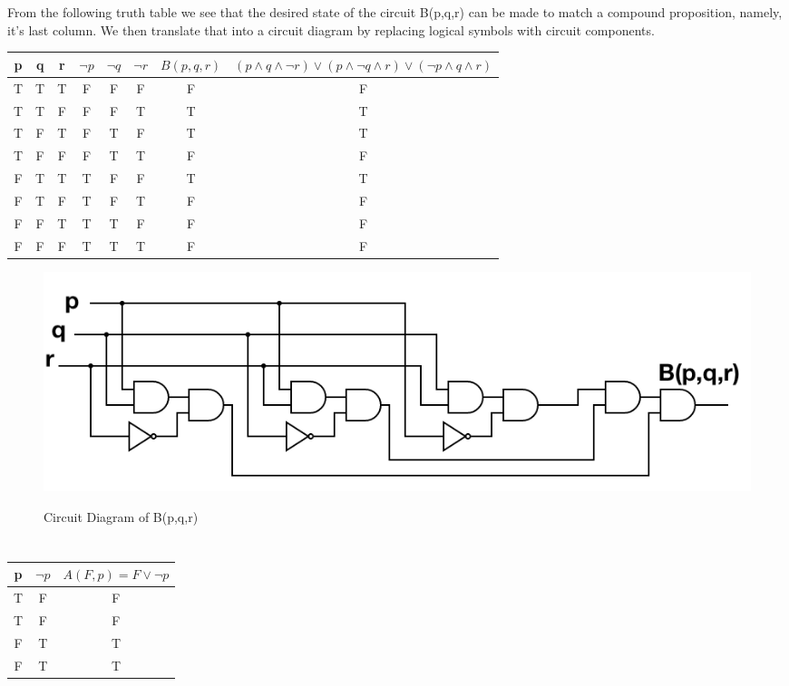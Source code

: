 \documentclass[11pt]{article}
\begin{document}
\section{} %
From the following truth table we see that the desired state of the circuit B(p,q,r) can be made to match a compound proposition, namely, it's last column. We then translate that into a circuit diagram by replacing logical symbols with circuit components. 
\begin{center}
\begin{tabular}{ c|c|c|c|c|c|c|c } 
	p & q & r & $\neg{p}$ & $\neg{q}$ & $\neg{r}$ & $B(p,q,r)$ & $(p \land q \land \neg{r}) \lor (p \land \neg{q} \land r) \lor (\neg{p} \land q \land r)$ \\
	\hline
	T & T & T & F & F & F & F & F \\
	T & T & F & F & F & T & T & T \\
	T & F & T & F & T & F & T & T \\
	T & F & F & F & T & T & F & F \\
	F & T & T & T & F & F & T & T \\
	F & T & F & T & F & T & F & F \\
	F & F & T & T & T & F & F & F \\
	F & F & F & T & T & T & F & F \\
\end{tabular}
\end{center}
\begin{figure}[h]
	\centering
	\includegraphics[scale=0.4]{CSE311HW1Diagram.png}
	\label{Circuit Diagram of B(p,q,r)}
	\caption{Circuit Diagram of B(p,q,r)}
\end{figure}

\section{} %

\subsection{} %
\begin{center}
\begin{tabular}{ c|c|c } 
	p & $\neg{p}$ & $A(F,p) = F \lor \neg{p}$ \\
	\hline
	T & F & F \\
	T & F & F \\
	F & T & T \\
	F & T & T \\
\end{tabular}
\end{center}
\end{document}
